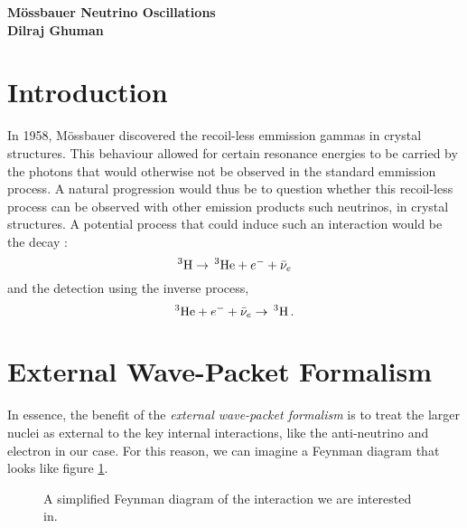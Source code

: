 \documentclass[10pt]{article}
\begin{document}
\begin{center}
  {\Large \bf M\"{o}ssbauer Neutrino Oscillations}\\
  {\small \bf Dilraj Ghuman}
\end{center}
\vspace{2em}

\section{Introduction}

In 1958, M\"{o}ssbauer discovered the recoil-less emmission gammas in crystal structures. This behaviour allowed for certain resonance energies to be carried by the photons that would otherwise not be observed in the standard emmission process. A natural progression would thus be to question whether this recoil-less process can be observed with other emission products such neutrinos, in crystal structures. A potential process that could induce such an interaction would be the decay :
\[^{3} \textnormal{H} \to\,  ^{3}\textnormal{He} + e^{-} + \bar{\nu}_{e}\]
and the detection using the inverse process,
\[^{3}\textnormal{He} + e^{-} + \bar{\nu}_{e} \to\, ^{3} \textnormal{H}\, .\]

\section{External Wave-Packet Formalism}
In essence, the benefit of the \textit{external wave-packet formalism} is to treat the larger nuclei as external to the key internal interactions, like the anti-neutrino and electron in our case. For this reason, we can imagine a Feynman diagram that looks like figure \ref{fig:feyn}.


\begin{figure}[h]
  \centering
    \caption{A simplified Feynman diagram of the interaction we are interested in.}
    \label{fig:feyn}
\end{figure}
\end{document}
